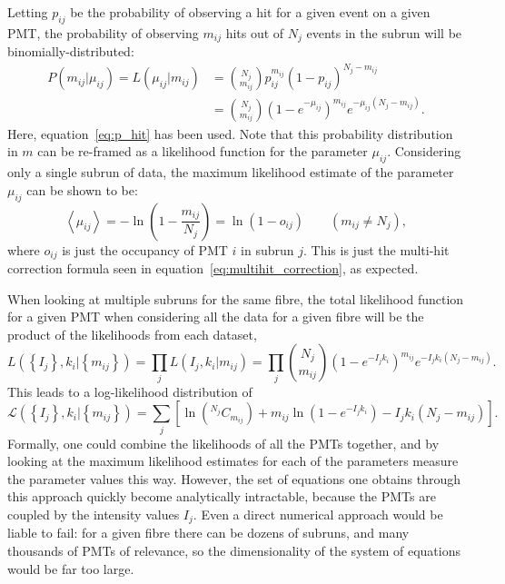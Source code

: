 Letting $p_{ij}$ be the probability of observing a hit for a given event on a given PMT, the probability of observing $m_{ij}$ hits out of $N_{j}$ events in the subrun will be binomially-distributed:
\begin{align}
    P(m_{ij}| \mu_{ij}) = L(\mu_{ij} | m_{ij}) &= \binom{N_{j}}{m_{ij}}p_{ij}^{m_{ij}}(1-p_{ij})^{N_{j}-m_{ij}}\\ 
    &= \binom{N_{j}}{m_{ij}}\left(1-e^{-\mu_{ij}}\right)^{m_{ij}}e^{-\mu_{ij}(N_{j}-m_{ij})}.
\end{align}
Here, equation~\ref{eq:p_hit} has been used. Note that this probability distribution in $m$ can be re-framed as a likelihood function for the parameter $\mu_{ij}$. Considering only a single subrun of data, the maximum likelihood estimate of the parameter $\mu_{ij}$ can be shown to be:
\begin{equation}
    \left<\mu_{ij}\right> = -\ln\left(1-\frac{m_{ij}}{N_{j}}\right) = \ln\left(1-o_{ij}\right) \qquad(m_{ij} \neq N_{j}),
\end{equation}
where $o_{ij}$ is just the occupancy of PMT $i$ in subrun $j$. This is just the multi-hit correction formula seen in equation~\ref{eq:multihit_correction}, as expected.

When looking at multiple subruns for the same fibre, the total likelihood function for a given PMT when considering all the data for a given fibre will be the product of the likelihoods from each dataset,
\begin{equation}
    L\left(\left\{I_{j}\right\}, k_{i} | \left\{m_{ij}\right\}\right) = \prod_{j} L(I_{j}, k_{i} | m_{ij}) = \prod_{j}\binom{N_{j}}{m_{ij}}\left(1-e^{-I_{j}k_{i}}\right)^{m_{ij}}e^{-I_{j}k_{i}(N_{j}-m_{ij})}.
\end{equation}
This leads to a log-likelihood distribution of
\begin{equation}
    \mathcal{L}\left(\left\{I_{j}\right\}, k_{i} | \left\{m_{ij}\right\}\right) = \sum_{j}\left[\ln\left(^{N_{j}}C_{m_{ij}}\right) + m_{ij}\ln\left(1 - e^{-I_{j}k_{i}}\right) - I_{j}k_{i}\left(N_{j} - m_{ij}\right)\right].
\end{equation}
Formally, one could combine the likelihoods of all the PMTs together, and by looking at the maximum likelihood estimates for each of the parameters measure the parameter values this way. However, the set of equations one obtains through this approach quickly become analytically intractable, because the PMTs are coupled by the intensity values $I_{j}$. Even a direct numerical approach would be liable to fail: for a given fibre there can be dozens of subruns, and many thousands of PMTs of relevance, so the dimensionality of the system of equations would be far too large.

